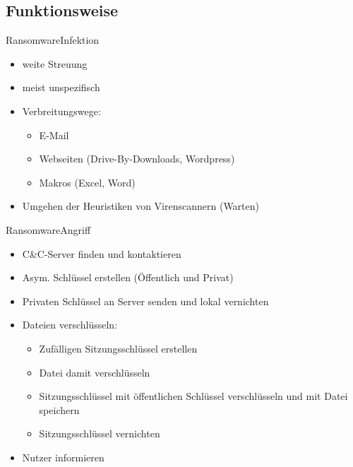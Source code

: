 \documentclass[notes,10pt]{beamer}
\begin{document}
\subsection{Funktionsweise}
\begin{frame}{Ransomware}{Infektion}
		\begin{itemize}
			\item weite Streuung
			\item meist unspezifisch
			\item Verbreitungswege:
				\begin{itemize}
					\item E-Mail
					\item Webseiten (Drive-By-Downloads, Wordpress)
					\item Makros (Excel, Word)
				\end{itemize}
			\item Umgehen der Heuristiken von Virenscannern (Warten)
		\end{itemize}
\end{frame}
\begin{frame}{Ransomware}{Angriff}
		\begin{itemize}
			\item C\&C-Server finden und kontaktieren 
			\item Asym. Schlüssel erstellen (Öffentlich und Privat)
			\item Privaten Schlüssel an Server senden und lokal vernichten
			\item Dateien verschlüsseln:
				\begin{itemize}
					\item Zufälligen Sitzungsschlüssel erstellen
					\item Datei damit verschlüsseln
					\item Sitzungsschlüssel mit öffentlichen Schlüssel verschlüsseln und mit Datei speichern
					\item Sitzungsschlüssel vernichten
				\end{itemize}
			\item Nutzer informieren
		\end{itemize}
\end{frame}


\end{document}
